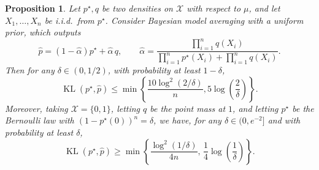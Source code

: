 \documentclass[11pt]{article}
\renewcommand{\le}{\leqslant}
\renewcommand{\ge}{\geqslant}
\newcommand{\X}{\mathcal{X}}
\newcommand{\kl}{\operatorname{KL}}
\newtheorem{proposition}{Proposition}
\theoremstyle{definition}
\theoremstyle{remark}
\begin{document}
\begin{proposition}
\label{prop:bayes-two}
Let $p^\star,q$ be two densities on $\X$ with respect to $\mu$, and let $X_1,\ldots,X_n$ be i.i.d.\ from $p^\star$. Consider Bayesian model averaging with a uniform prior, which outputs
\[
\widehat p=(1-\widehat\alpha)p^\star+\widehat\alpha\,q,\qquad
\widehat\alpha=\frac{\prod_{i=1}^n q(X_i)}{\prod_{i=1}^n p^\star(X_i)+\prod_{i=1}^n q(X_i)}.
\]
Then for any $\delta\in(0,1/2)$, with probability at least $1-\delta$,
\[
\kl(p^\star,\widehat p)\le \min\left\{\frac{10\log^2(2/\delta)}{n}, 5\log\left(\frac{2}{\delta}\right)\right\}.
\]
Moreover, taking $\X=\{0,1\}$, letting $q$ be the point mass at $1$, and letting $p^\star$ be the Bernoulli law with $(1-p^\star(0))^n=\delta$, we have, for any $\delta\in(0,e^{-2}]$ and with probability at least $\delta$,
\[
\kl(p^\star,\widehat p)\ge \min\left\{\frac{\log^2(1/\delta)}{4n},\, \frac{1}{4}\log\left(\frac{1}{\delta}\right)\right\}.
\]
\end{proposition}
\end{document}
